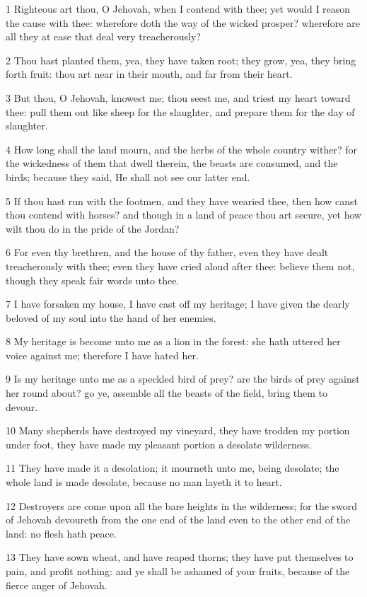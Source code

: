 \par 1 Righteous art thou, O Jehovah, when I contend with thee; yet would I reason the cause with thee: wherefore doth the way of the wicked prosper? wherefore are all they at ease that deal very treacherously?
\par 2 Thou hast planted them, yea, they have taken root; they grow, yea, they bring forth fruit: thou art near in their mouth, and far from their heart.
\par 3 But thou, O Jehovah, knowest me; thou seest me, and triest my heart toward thee: pull them out like sheep for the slaughter, and prepare them for the day of slaughter.
\par 4 How long shall the land mourn, and the herbs of the whole country wither? for the wickedness of them that dwell therein, the beasts are consumed, and the birds; because they said, He shall not see our latter end.
\par 5 If thou hast run with the footmen, and they have wearied thee, then how canst thou contend with horses? and though in a land of peace thou art secure, yet how wilt thou do in the pride of the Jordan?
\par 6 For even thy brethren, and the house of thy father, even they have dealt treacherously with thee; even they have cried aloud after thee: believe them not, though they speak fair words unto thee.
\par 7 I have forsaken my house, I have cast off my heritage; I have given the dearly beloved of my soul into the hand of her enemies.
\par 8 My heritage is become unto me as a lion in the forest: she hath uttered her voice against me; therefore I have hated her.
\par 9 Is my heritage unto me as a speckled bird of prey? are the birds of prey against her round about? go ye, assemble all the beasts of the field, bring them to devour.
\par 10 Many shepherds have destroyed my vineyard, they have trodden my portion under foot, they have made my pleasant portion a desolate wilderness.
\par 11 They have made it a desolation; it mourneth unto me, being desolate; the whole land is made desolate, because no man layeth it to heart.
\par 12 Destroyers are come upon all the bare heights in the wilderness; for the sword of Jehovah devoureth from the one end of the land even to the other end of the land: no flesh hath peace.
\par 13 They have sown wheat, and have reaped thorns; they have put themselves to pain, and profit nothing: and ye shall be ashamed of your fruits, because of the fierce anger of Jehovah.
